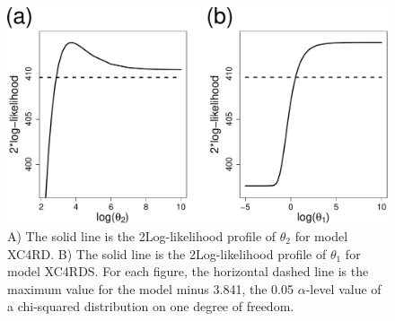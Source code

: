 \documentclass[11pt, titlepage]{article}\usepackage[]{graphicx}\usepackage[]{color}
\begin{document}
\begin{figure}[H]
  \begin{center}
  \includegraphics[width=\linewidth]{figure/Fig-thetaProfiles-crop.pdf}
  \end{center}
  \caption{A) The solid line is the 2Log-likelihood profile of $\theta_2$ for model XC4RD. B) The solid line is the 2Log-likelihood profile of $\theta_1$ for model XC4RDS.  For each figure, the horizontal dashed line is the maximum value for the model minus 3.841, the 0.05 $\alpha$-level value of a chi-squared distribution on one degree of freedom. \label{Fig-thetaProfiles}}     
\end{figure}


\end{document}
